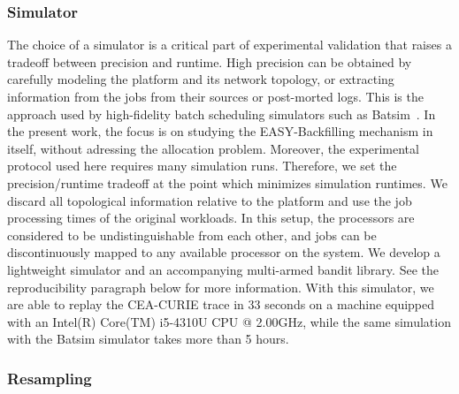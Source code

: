 \documentclass[sigconf]{acmart}
\begin{document}
\subsubsection{Simulator}

The choice of a simulator is a critical part of experimental validation that
raises a tradeoff between precision and runtime. High precision can be obtained
by carefully modeling the platform and its network topology, or extracting
information from the jobs from their sources or post-morted logs. This is the
approach used by high-fidelity batch scheduling simulators such as Batsim~\cite{batsim}. In
the present work, the focus is on studying the EASY-Backfilling mechanism in
itself, without adressing the allocation problem. Moreover, the experimental
protocol used here requires many simulation runs. Therefore, we set the
precision/runtime tradeoff at the point which minimizes simulation runtimes. We
discard all topological information relative to the platform and use the job
processing times of the original workloads. In this setup, the processors are
considered to be undistinguishable from each other, and jobs can be
discontinuously mapped to any available processor on the system. We develop
a lightweight simulator\cite{ocst} and an accompanying multi-armed bandit
library\cite{obandit}. See the reproducibility paragraph below for more information.
With this simulator, we are able to replay the CEA-CURIE trace in 33 seconds on a
machine equipped with an Intel(R) Core(TM) i5-4310U CPU @ 2.00GHz, while the
same simulation with the Batsim simulator takes more than 5 hours.

\subsubsection{Resampling}


\end{document}
